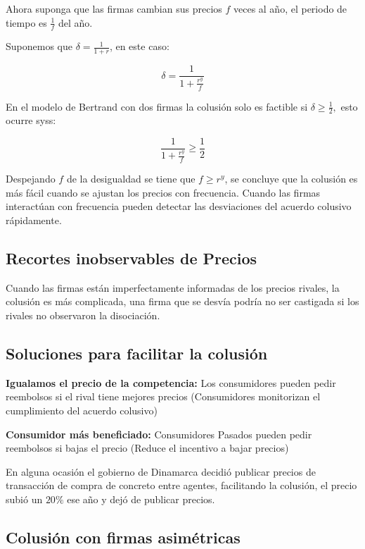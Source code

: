 \documentclass[letterpaper,12pt,twocolumn]{report}
\begin{document}
Ahora suponga que las firmas cambian sus precios $f$ veces al año, el periodo de tiempo es $\frac{1}{f}$ del año.

Suponemos que $\delta = \frac{1}{1+r}$, en este caso:

$$\delta = \frac{1}{1+\frac{r^y}{f}}$$

En el modelo de Bertrand con dos firmas la colusión solo es factible si $\delta\geq\frac{1}{2},$ esto ocurre syss:

$$\dfrac{1}{1+\frac{r^y}{f}}\geq \dfrac{1}{2}$$

Despejando $f$ de la desigualdad se tiene que $f\geq r^y$, se concluye que la colusión es más fácil cuando se ajustan los precios con frecuencia. Cuando las firmas interactúan con frecuencia pueden detectar las desviaciones del acuerdo colusivo rápidamente.

\subsection*{Recortes inobservables de Precios}

Cuando las firmas están imperfectamente informadas de los precios rivales, la colusión es más complicada, una firma que se desvía podría no ser castigada si los rivales no observaron la disociación.

\subsection*{Soluciones para facilitar la colusión}

\textbf{Igualamos el precio de la competencia:} Los consumidores pueden pedir reembolsos si el rival tiene mejores precios (Consumidores monitorizan el cumplimiento del acuerdo colusivo)

\textbf{Consumidor más beneficiado:} Consumidores Pasados pueden pedir reembolsos si bajas el precio (Reduce el incentivo a bajar precios)

\begin{tcolorbox}[title= Ejemplo]
	En alguna ocasión el gobierno de Dinamarca decidió publicar precios de transacción de compra de concreto entre agentes, facilitando la colusión, el precio subió un $20\%$ ese año y dejó de publicar precios.
\end{tcolorbox}

\subsection*{Colusión con firmas asimétricas}
\end{document}
